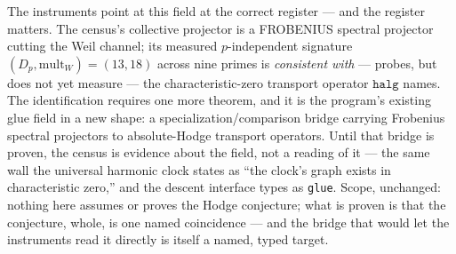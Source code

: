 \documentclass[11pt]{article}
\theoremstyle{definition}
\theoremstyle{remark}
\begin{document}
The instruments point at this field at the correct register --- and
the register matters.  The census's collective projector is a
FROBENIUS spectral projector cutting the Weil channel; its measured
$p$-independent signature $(D_p,\mathrm{mult}_W)=(13,18)$ across nine
primes is \emph{consistent with} --- probes, but does not yet measure
--- the characteristic-zero transport operator $\mathtt{halg}$ names.
The identification requires one more theorem, and it is the program's
existing glue field in a new shape: a specialization/comparison bridge
carrying Frobenius spectral projectors to absolute-Hodge transport
operators.  Until that bridge is proven, the census is evidence about
the field, not a reading of it --- the same wall the universal
harmonic clock states as ``the clock's graph exists in characteristic
zero,'' and the descent interface types as \texttt{glue}.  Scope,
unchanged: nothing here assumes or proves the Hodge conjecture; what
is proven is that the conjecture, whole, is one named coincidence ---
and the bridge that would let the instruments read it directly is
itself a named, typed target.
\end{document}
